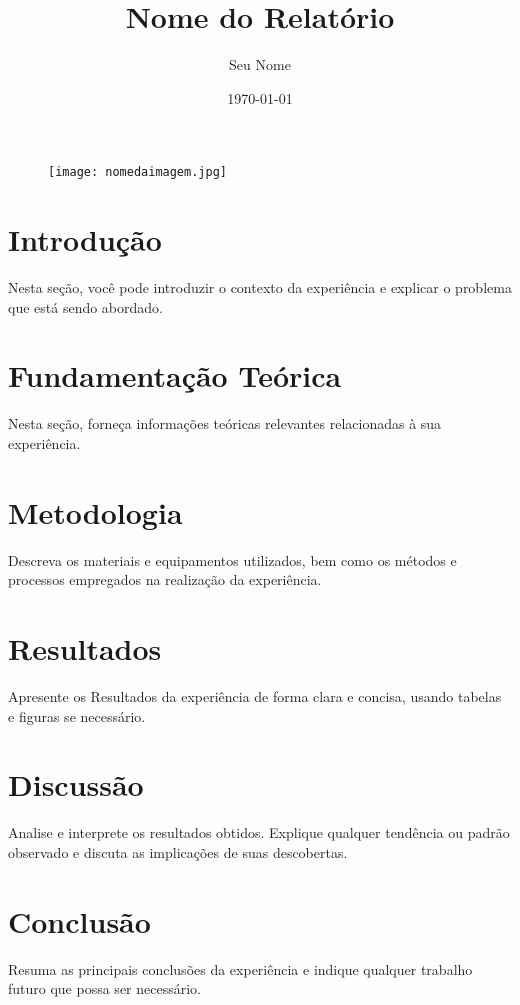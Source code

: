 \documentclass[a4paper, 12pt]{abntex2}
\title{Nome do Relatório}
\author{Seu Nome}
\date{\today}
\begin{document}

\begin{figure}
\centering
\texttt{[image: nomedaimagem.jpg]} %
\end{figure}

\maketitle

\newpage %

\tableofcontents

\newpage %

\section{Introdução}
Nesta seção, você pode introduzir o contexto da experiência e explicar o problema que está sendo abordado.

\section{Fundamentação Teórica}
Nesta seção, forneça informações teóricas relevantes relacionadas à sua experiência.

\section{Metodologia}
Descreva os materiais e equipamentos utilizados, bem como os métodos e processos empregados na realização da experiência.

\section{Resultados}
Apresente os Resultados da experiência de forma clara e concisa, usando tabelas e figuras se necessário.

\section{Discussão}
Analise e interprete os resultados obtidos. Explique qualquer tendência ou padrão observado e discuta as implicações de suas descobertas.

\section{Conclusão}
Resuma as principais conclusões da experiência e indique qualquer trabalho futuro que possa ser necessário.

\newpage %



\restoregeometry
\end{document}
